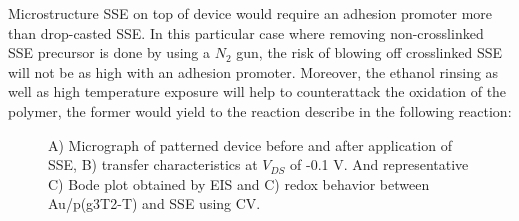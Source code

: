 Microstructure SSE on top of device would require an adhesion promoter more than drop-casted SSE. In this particular case where removing non-crosslinked SSE precursor is done by using a $N_{2}$ gun, the risk of blowing off crosslinked SSE will not be as high with an adhesion promoter. Moreover, the ethanol rinsing as well as high temperature exposure will help to counterattack the oxidation of the polymer, the former would yield to the reaction describe in the following reaction: 


\centering {} \label{f:ethanol}

\begin{figure}[ht]
    \centering
    \hspace{2em}
    \qquad
    \caption[Performance of solid-OECT with photolithographed SSE]{A) Micrograph of patterned device before and after application of SSE, B) transfer characteristics at $V_{DS}$ of -0.1 V. And representative C) Bode plot obtained by EIS and C) redox behavior between Au/p(g3T2-T) and SSE using CV.}
    \label{fig:photoSSE}
\end{figure}

